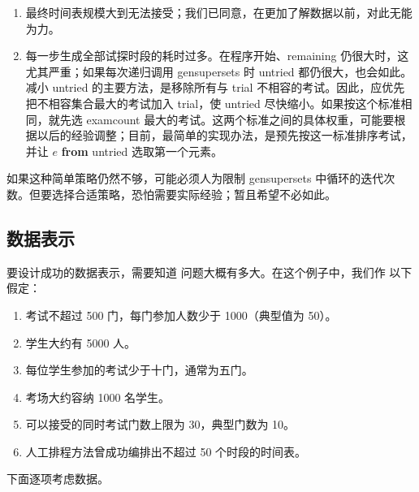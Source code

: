 \documentclass[twoside,11pt,fontset=none]{ctexbook}
\begin{document}
\begin{enumerate}[wide, nosep, label=(\arabic*)]
	\item 最终时间表规模大到无法接受；我们已同意，在更加了解数据以前，对此无能为力。

	\item 每一步生成全部试探时段的耗时过多。在程序开始、remaining 仍很大时，这尤其严重；如果每次递归调用 gensupersets 时 untried 都仍很大，也会如此。减小 untried 的主要方法，是移除所有与 trial 不相容的考试。因此，应优先把不相容集合最大的考试加入 trial，使 untried 尽快缩小。如果按这个标准相同，就先选 examcount 最大的考试。这两个标准之间的具体权重，可能要根据以后的经验调整；目前，最简单的实现办法，是预先按这一标准排序考试，并让 $e$ \textbf{from} untried 选取第一个元素。
\end{enumerate}

如果这种简单策略仍然不够，可能必须人为限制 gensupersets 中循环的迭代次数。但要选择合适策略，恐怕需要实际经验；暂且希望不必如此。

\subsection{数据表示}

要设计成功的数据表示，需要知道
问题大概有多大。在这个例子中，我们作
以下假定：

\begin{enumerate}[wide, nosep, label=(\arabic*)]
	\item 考试不超过 500 门，每门参加人数少于 1000（典型值为 50）。
	\item 学生大约有 5000 人。
	\item 每位学生参加的考试少于十门，通常为五门。
	\item 考场大约容纳 1000 名学生。
	\item 可以接受的同时考试门数上限为 30，典型门数为 10。
	\item 人工排程方法曾成功编排出不超过 50 个时段的时间表。
\end{enumerate}

下面逐项考虑数据。
\end{document}
